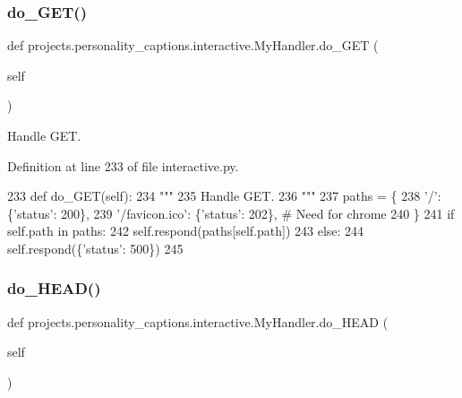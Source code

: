 \subsubsection{\texorpdfstring{do\+\_\+\+G\+E\+T()}{do\_GET()}}
{\footnotesize\ttfamily def projects.\+personality\+\_\+captions.\+interactive.\+My\+Handler.\+do\+\_\+\+G\+ET (\begin{DoxyParamCaption}\item[{}]{self }\end{DoxyParamCaption})}

\begin{DoxyVerb}Handle GET.
\end{DoxyVerb}
 

Definition at line 233 of file interactive.\+py.


\begin{DoxyCode}
233     \textcolor{keyword}{def }do\_GET(self):
234         \textcolor{stringliteral}{"""}
235 \textcolor{stringliteral}{        Handle GET.}
236 \textcolor{stringliteral}{        """}
237         paths = \{
238             \textcolor{stringliteral}{'/'}: \{\textcolor{stringliteral}{'status'}: 200\},
239             \textcolor{stringliteral}{'/favicon.ico'}: \{\textcolor{stringliteral}{'status'}: 202\},  \textcolor{comment}{# Need for chrome}
240         \}
241         \textcolor{keywordflow}{if} self.path \textcolor{keywordflow}{in} paths:
242             self.respond(paths[self.path])
243         \textcolor{keywordflow}{else}:
244             self.respond(\{\textcolor{stringliteral}{'status'}: 500\})
245 
\end{DoxyCode}
\mbox{\label{classprojects_1_1personality__captions_1_1interactive_1_1MyHandler_a51c600da08cf2f01d860f4a4c500e827}} 
\subsubsection{\texorpdfstring{do\+\_\+\+H\+E\+A\+D()}{do\_HEAD()}}
{\footnotesize\ttfamily def projects.\+personality\+\_\+captions.\+interactive.\+My\+Handler.\+do\+\_\+\+H\+E\+AD (\begin{DoxyParamCaption}\item[{}]{self }\end{DoxyParamCaption})}

